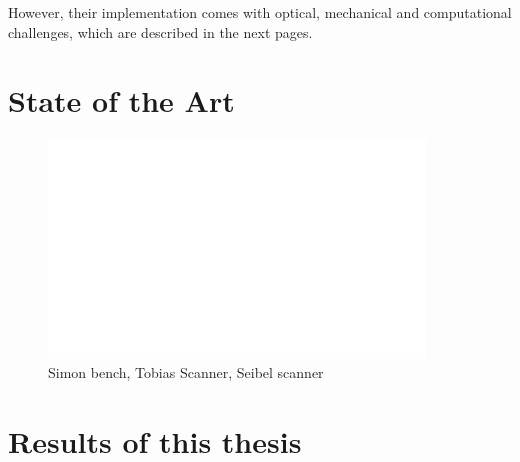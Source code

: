 However, their implementation comes with optical, mechanical and computational challenges, which are described in the next pages.




\clearpage
\section{State of the Art}
\begin{figure}[h!]
      \centering
      \includegraphics[width=10cm,draft]{figures/foo.png}
      \caption{Simon bench, Tobias Scanner, Seibel scanner}
\end{figure}


\clearpage
\section{Results of this thesis}
